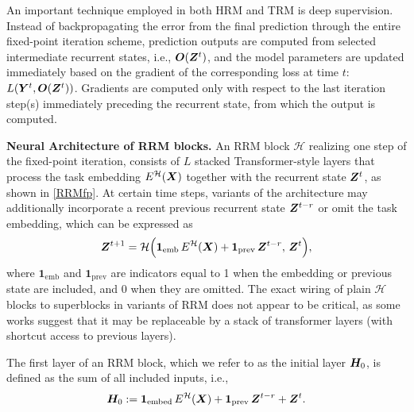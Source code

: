 \documentclass{article}
\theoremstyle{plain}
\theoremstyle{definition}
\theoremstyle{remark}
\renewcommand{\paragraph}[1]{\textbf{#1}\;}
\begin{document}
An important technique employed in both HRM and TRM is deep supervision. Instead of backpropagating the error from the final prediction through the entire fixed-point iteration scheme, prediction outputs are computed from selected intermediate recurrent states, i.e., $\bm{O}(\bm{Z}^t)$, and the model parameters are updated immediately based on the gradient of the corresponding loss at time $t$: $L(\bm{Y}^t, \bm{O}(\bm{Z}^t))$. Gradients are computed only with respect to the last iteration step(s) immediately preceding the recurrent state, from which the output is computed. 


\paragraph{Neural Architecture of RRM blocks.}
%
An RRM block $\mathcal{H}$ realizing one step of the fixed-point iteration, consists of $L$ stacked Transformer-style layers that process the task embedding $E^{\mathcal H}(\bm{X})$ together with the recurrent state $\bm{Z}^t$, as shown in \cref{RRMfp}. At certain time steps, variants of the architecture may additionally incorporate a recent previous recurrent state $\bm{Z}^{t-r}$ or omit the task embedding, which can be expressed as
\begin{equation}
\bm{Z}^{t+1} = \mathcal H\Big(\mathbf{1}_{\text{emb}}\, E^{\mathcal H}(\bm{X}) + \mathbf{1}_{\text{prev}}\, \bm{Z}^{t-r}, \, \bm{Z}^t\Big), \label{myfprrmb}
\end{equation}
where $\mathbf{1}_{\text{emb}}$ and $\mathbf{1}_{\text{prev}}$ are indicators equal to 1 when the embedding or previous state are included, and 0 when they are omitted. The exact wiring of plain $\mathcal H$ blocks to superblocks in variants of RRM does not appear to be critical, as some works \citep{arc2025hidden, liao2026srm} suggest that it may be replaceable by a stack of transformer layers (with shortcut access to previous layers).

The first layer of an RRM block, which we refer to as the initial layer $\bm{H}_0$, is defined as the sum of all included inputs, i.e.,
\begin{align} 
\bm{H}_0:=\mathbf{1}_{\text{embed}}\, E^{\mathcal H}(\bm{X}) + \mathbf{1}_{\text{prev}}\, \bm{Z}^{t-r} + \bm{Z}^t. \label{eq:rrmb0}
\end{align} 
\end{document}
